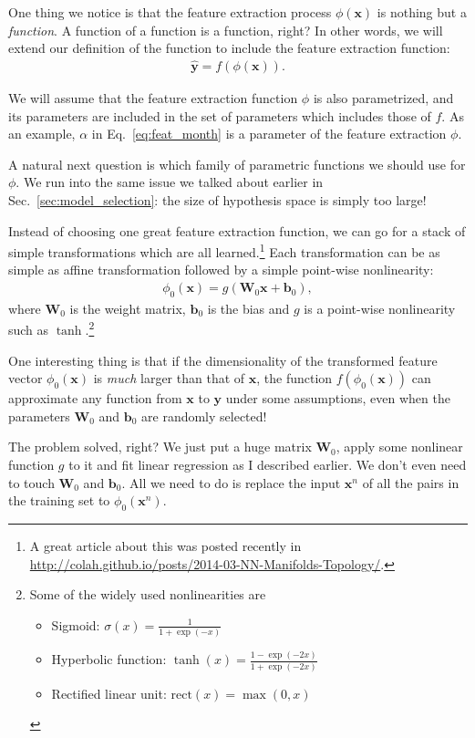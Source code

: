 \documentclass{report}
\newcommand{\vect}[1]{\mathbf{#1}}
\newcommand{\matr}[1]{\mathbf{#1}}
\newcommand{\vb}[0]{\vect{b}}
\newcommand{\vx}[0]{\vect{x}}
\newcommand{\vy}[0]{\vect{y}}
\newcommand{\mW}[0]{\matr{W}}
\newcommand{\rect}{\text{rect}}
\begin{document}
One thing we notice is that the feature extraction process $\phi(\vx)$ is
nothing but a {\em function}. A function of a function is a function, right? In
other words, we will extend our definition of the function to include the
feature extraction function:
\begin{align*}
    \hat{\vy} = f(\phi(\vx)).
\end{align*}

We will assume that the feature extraction function $\phi$ is also parametrized,
and its parameters are included in the set of parameters which includes those of
$f$. As an example, $\alpha$ in Eq.~\eqref{eq:feat_month} is a parameter of the
feature extraction $\phi$.

A natural next question is which family of parametric functions we should use
for $\phi$. We run into the same issue we talked about earlier in
Sec.~\ref{sec:model_selection}: the size of hypothesis space is simply too
large!

Instead of choosing one great feature extraction function, we can go for a stack
of simple transformations which are all learned.\footnote{
    A great article about this was posted recently in
    \url{http://colah.github.io/posts/2014-03-NN-Manifolds-Topology/}.
}
Each transformation can be as simple as affine transformation followed by a
simple point-wise nonlinearity:
\begin{align}
    \label{eq:layer}
    \phi_0(\vx) = g(\mW_0 \vx + \vb_0),
\end{align}
where $\mW_0$ is the weight matrix, $\vb_0$ is the bias and $g$ is a point-wise
nonlinearity such as $\tanh$.\footnote{
    Some of the widely used nonlinearities are
    \begin{itemize}
        \item Sigmoid: $\sigma(x) = \frac{1}{1+\exp(-x)}$
        \item Hyperbolic function: $\tanh(x) = \frac{1-\exp(-2x)}{1+\exp(-2x)}$
        \item Rectified linear unit: $\rect(x) = \max(0, x)$
    \end{itemize}
}

One interesting thing is that if the dimensionality of the transformed feature
vector $\phi_0(\vx)$ is {\em much} larger than that of $\vx$, the function
$f(\phi_0(\vx))$ can approximate any function from $\vx$ to $\vy$ under some
assumptions, even when the parameters $\mW_0$ and $\vb_0$ are randomly
selected! \citep{Cover1965} 

The problem solved, right? We just put a huge matrix $\mW_0$, apply some
nonlinear function $g$ to it and fit linear regression as I described earlier.
We don't even need to touch $\mW_0$ and $\vb_0$. All we need to do is replace
the input $\vx^n$ of all the pairs in the training set to $\phi_0(\vx^n)$.
\end{document}
